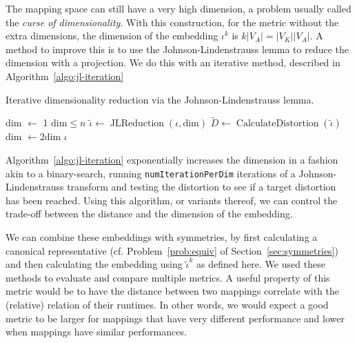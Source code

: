 The mapping space can still have a very high dimension, a problem usually called the \emph{curse of dimensionality}.
With this construction, for the metric without the extra dimensions, the dimension of the embedding $\iota^k$ is $k |V_A| = |V_K| |V_A|$.
A method to improve this is to use the Johnson-Lindenstrauss lemma to reduce the dimension with a projection.
We do this with an iterative method, described in Algorithm~\ref{algo:jl-iteration}

\begin{algorithm}
	\caption{Iterative dimensionality reduction via the Johnson-Lindenstrauss lemma.} 
	\label{algo:jl-iteration}
	\begin{algorithmic}[1]
	 \State dim $\leftarrow$ 1
	 \While $\text{dim} \leq n$
		       \State $\tilde \iota \leftarrow \operatorname{JLReduction}(\iota,\text{dim})$
			   \State $\tilde D \leftarrow \operatorname{CalculateDistortion}(\tilde \iota)$
			       \Return{$\tilde \iota$}
			   \EndIf
	   \EndFor 
	   \State dim $\leftarrow 2 \text{dim}$
   \EndWhile
   \Return $\iota$
	\end{algorithmic}
\end{algorithm}

Algorithm~\ref{algo:jl-iteration} exponentially increases the dimension in a fashion akin to a binary-search, running \texttt{numIterationPerDim} iterations of a Johnson-Lindenstrauss transform and testing the distortion to see if a target distortion has been reached.
Using this algorithm, or variants thereof, we can control the trade-off between the distance and the dimension of the embedding.

We can combine these embeddings with symmetries, by first calculating a canonical representative (cf. Problem~\ref{prob:equiv} of Section~\ref{sec:symmetries}) and then calculating the embedding using $\tilde \iota^k$ as defined here.
We used these methods to evaluate and compare multiple metrics. 
A useful property of this metric would be to have the distance between two mappings correlate with the (relative) relation of their runtimes.
In other words, we would expect a good metric to be larger for mappings that have very different performance and lower when mappings have similar performances.

